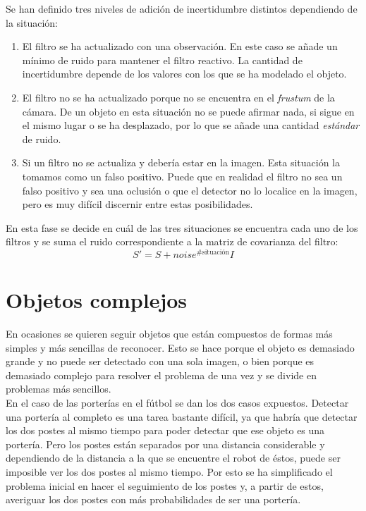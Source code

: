 Se han definido tres niveles de adición de incertidumbre distintos dependiendo de la situación:
\begin{enumerate}

\item El filtro se ha actualizado con una observación. En este caso se añade un mínimo de ruido para mantener el filtro reactivo. La cantidad de incertidumbre depende de los valores con los que se ha modelado el objeto.

\item El filtro no se ha actualizado porque no se encuentra en el \textit{frustum} de la cámara. De un objeto en esta situación no se puede afirmar nada, si sigue en el mismo lugar o se ha desplazado, por lo que se añade una cantidad \textit{estándar} de ruido.

\item Si un filtro no se actualiza y debería estar en la imagen. Esta situación la tomamos como un falso positivo. Puede que en realidad el filtro no sea un falso positivo y sea una oclusión o que el detector no lo localice en la imagen, pero es muy difícil discernir entre estas posibilidades.

\end{enumerate}

En esta fase se decide en cuál de las tres situaciones se encuentra cada uno de los filtros y se suma el ruido correspondiente a la matriz de covarianza del filtro:
\begin{equation}
  S' = S + noise^{\# \text{situación}} I
\end{equation}

\section{Objetos complejos}
\label{sec:objetoscomplejos}

En ocasiones se quieren seguir objetos que están compuestos de formas más simples y más sencillas de reconocer. Esto se hace porque el objeto es demasiado grande y no puede ser detectado con una sola imagen, o bien porque es demasiado complejo para resolver el problema de una vez y se divide en problemas más sencillos. \\

En el caso de las porterías en el fútbol se dan los dos casos expuestos. Detectar una portería al completo es una tarea bastante difícil, ya que habría que detectar los dos postes al mismo tiempo para poder detectar que ese objeto es una portería. Pero los postes están separados por una distancia considerable y dependiendo de la distancia a la que se encuentre el robot de éstos, puede ser imposible ver los dos postes al mismo tiempo. Por esto se ha simplificado el problema inicial en hacer el seguimiento de los postes y, a partir de estos, averiguar los dos postes con más probabilidades de ser una portería.

